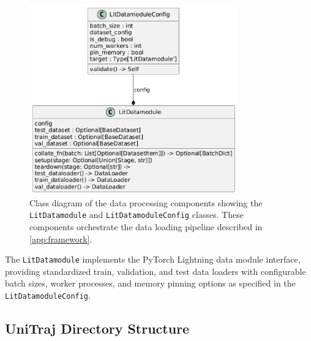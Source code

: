 \begin{figure}[H]
\centering
\includegraphics[width=0.8\textwidth]{figures/classes_LitDatmodule.png}
\caption{Class diagram of the data processing components showing the \texttt{LitDatamodule} and \texttt{LitDatamoduleConfig} classes. These components orchestrate the data loading pipeline described in \autoref{app:framework}.}
\label{fig:litdatamodule_class}
\end{figure}

The \texttt{LitDatamodule} implements the PyTorch Lightning data module interface, providing standardized train, validation, and test data loaders with configurable batch sizes, worker processes, and memory pinning options as specified in the \texttt{LitDatamoduleConfig}.

% 

\subsection{UniTraj Directory Structure}


